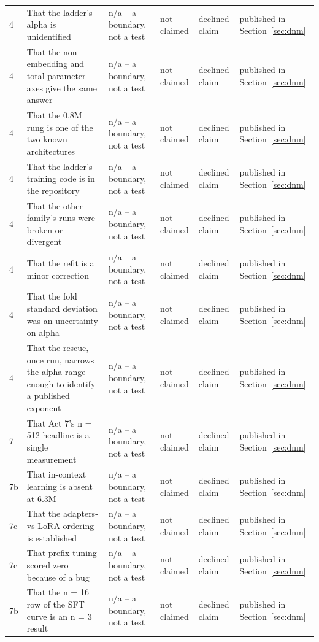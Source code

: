 {\begin{longtable}{L{0.9cm}L{2.8cm}L{2.7cm}L{3.0cm}L{1.9cm}L{2.1cm}}
4 & That the ladder's alpha is unidentified & n/a -- a boundary, not a test & not claimed & declined claim & published in Section~\ref{sec:dnm} \\
4 & That the non-embedding and total-parameter axes give the same answer & n/a -- a boundary, not a test & not claimed & declined claim & published in Section~\ref{sec:dnm} \\
4 & That the 0.8M rung is one of the two known architectures & n/a -- a boundary, not a test & not claimed & declined claim & published in Section~\ref{sec:dnm} \\
4 & That the ladder's training code is in the repository & n/a -- a boundary, not a test & not claimed & declined claim & published in Section~\ref{sec:dnm} \\
4 & That the other family's runs were broken or divergent & n/a -- a boundary, not a test & not claimed & declined claim & published in Section~\ref{sec:dnm} \\
4 & That the refit is a minor correction & n/a -- a boundary, not a test & not claimed & declined claim & published in Section~\ref{sec:dnm} \\
4 & That the fold standard deviation was an uncertainty on alpha & n/a -- a boundary, not a test & not claimed & declined claim & published in Section~\ref{sec:dnm} \\
4 & That the rescue, once run, narrows the alpha range enough to identify a published exponent & n/a -- a boundary, not a test & not claimed & declined claim & published in Section~\ref{sec:dnm} \\
7 & That Act 7's n = 512 headline is a single measurement & n/a -- a boundary, not a test & not claimed & declined claim & published in Section~\ref{sec:dnm} \\
7b & That in-context learning is absent at 6.3M & n/a -- a boundary, not a test & not claimed & declined claim & published in Section~\ref{sec:dnm} \\
7c & That the adapters-vs-LoRA ordering is established & n/a -- a boundary, not a test & not claimed & declined claim & published in Section~\ref{sec:dnm} \\
7c & That prefix tuning scored zero because of a bug & n/a -- a boundary, not a test & not claimed & declined claim & published in Section~\ref{sec:dnm} \\
7b & That the n = 16 row of the SFT curve is an n = 3 result & n/a -- a boundary, not a test & not claimed & declined claim & published in Section~\ref{sec:dnm} \\

\end{longtable}}
